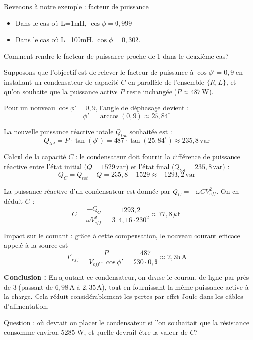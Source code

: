 	\begin{frame}[allowframebreaks]{Revenons à notre exemple : facteur de puissance}
	
	\begin{itemize}
		\item Dans le cas où L=1mH, $ \cos \phi = {0,999}$ 
		\item Dans le cas où L=100mH, $ \cos \phi = {0,302}$.
	\end{itemize}
	
	\alert{Comment rendre le facteur de puissance proche de 1 dans le deuxième cas?}

	Supposons que l'objectif est de relever le facteur de puissance à $\cos \phi' = 0,9$ en installant un condensateur de capacité $C$ en parallèle de l'ensemble $\{R, L\}$, et qu'on souhaite que la puissance active $P$ reste inchangée ($P \approx 487 \, \text{W}$). 
	
	Pour un nouveau $\cos \phi' = 0,9$, l'angle de déphasage devient :
	\[ \phi' = \arccos(0,9) \approx 25,84^\circ \]

	La nouvelle puissance réactive totale $Q_{tot}$ souhaitée est :
	\[ Q_{tot} = P \cdot \tan(\phi') = 487 \cdot \tan(25,84^\circ) \approx 235,8 \, \text{var} \]

	Calcul de la capacité $C$ : 
	le condensateur doit fournir la différence de puissance réactive entre l'état initial ($Q = 1529 \, \text{var}$) et l'état final ($Q_{tot} = 235,8 \, \text{var}$) :
	\[ Q_C = Q_{tot} - Q = 235,8 - 1529 \approx -1293,2 \, \text{var} \]

	La puissance réactive d'un condensateur est donnée par $Q_C = -\omega C V_{eff}^2$. On en déduit $C$ :
	\[ C = \frac{-Q_C}{\omega V_{eff}^2} = \frac{1293,2}{314,16 \cdot 230^2} \approx 77,8 \, \mu\text{F} \]

	Impact sur le courant : 
	grâce à cette compensation, le nouveau courant efficace appelé à la source est 
	\[ I'_{eff} = \frac{P}{V_{eff} \cdot \cos \phi'} = \frac{487}{230 \cdot 0,9} \approx 2,35 \, \text{A} \]

	\textbf{Conclusion :} En ajoutant ce condensateur, on divise le courant de ligne par près de 3 (passant de $6,98 \, \text{A}$ à $2,35 \, \text{A}$), tout en fournissant la même puissance active à la charge. Cela réduit considérablement les pertes par effet Joule dans les câbles d'alimentation.

	\alert{Question : où devrait on placer le condensateur si l'on souhaitait que la résistance consomme environ 5285 W, et quelle devrait-être la valeur de $C$?}

	\end{frame}

